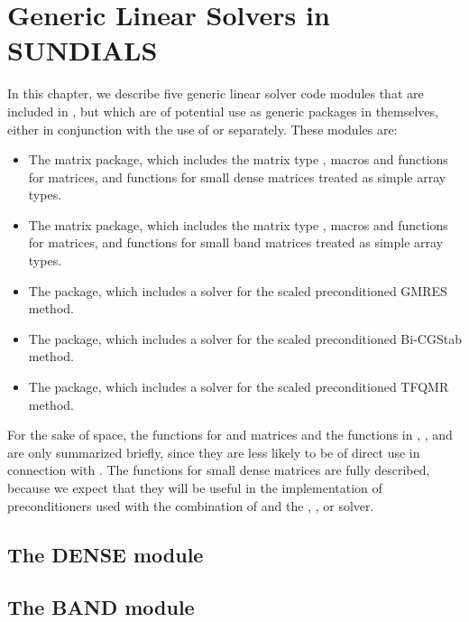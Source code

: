 \chapter{Generic Linear Solvers in SUNDIALS}\label{s:gen_linsolv}
In this chapter, we describe five generic linear solver code modules that 
are included in {\cvode}, but which are of potential use as generic packages in
themselves, either in conjunction with the use of {\cvode} or separately.
These modules are:
\begin{itemize}
\item The {\dense} matrix package, which includes the matrix type ,
      macros and functions for  matrices, and functions
      for small dense matrices treated as simple array types.
\item The {\band} matrix package, which includes the matrix type ,
      macros and functions for  matrices, and functions
      for small band matrices treated as simple array types.
\item The {\spgmr} package, which includes a solver for the scaled
      preconditioned GMRES method.
\item The {\spbcg} package, which includes a solver for the scaled
      preconditioned Bi-CGStab method.
\item The {\sptfqmr} package, which includes a solver for the scaled
      preconditioned TFQMR method.
\end{itemize}

For the sake of space, the functions for  and
 matrices and the functions in {\spgmr}, {\spbcg}, and {\sptfqmr}
are only summarized briefly, since they are less likely to be of direct use
in connection with {\cvode}.  The functions for small dense matrices are fully
described, because we expect that they will be useful in the
implementation of preconditioners used with the combination of {\cvode}
and the {\cvspgmr}, {\cvspbcg}, or {\cvsptfqmr} solver.

\section{The DENSE module}\label{ss:dense}


\section{The BAND module}\label{ss:band}


